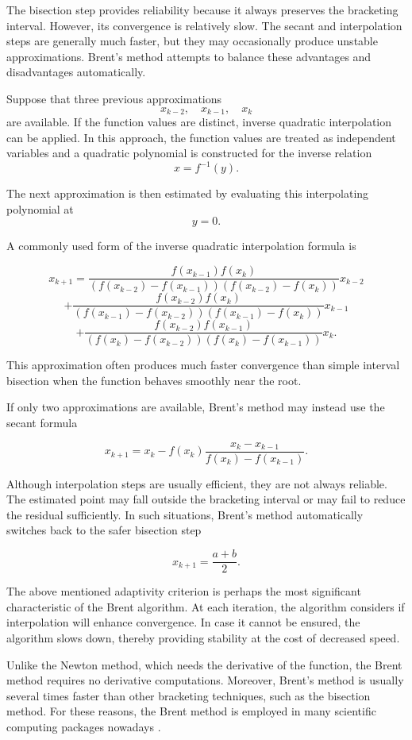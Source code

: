 The bisection step provides reliability because it always preserves the bracketing interval. However, its convergence is relatively slow. The secant and interpolation steps are generally much faster, but they may occasionally produce unstable approximations. Brent's method attempts to balance these advantages and disadvantages automatically.

Suppose that three previous approximations
\[
x_{k-2}, \quad x_{k-1}, \quad x_k
\]
are available. If the function values are distinct, inverse quadratic interpolation can be applied. In this approach, the function values are treated as independent variables and a quadratic polynomial is constructed for the inverse relation
\[
x=f^{-1}(y).
\]

The next approximation is then estimated by evaluating this interpolating polynomial at
\[
y=0.
\]

A commonly used form of the inverse quadratic interpolation formula is

\[
x_{k+1}
=
\frac{
f(x_{k-1})f(x_k)
}{
(f(x_{k-2})-f(x_{k-1}))(f(x_{k-2})-f(x_k))
}x_{k-2}
\]
\[
+
\frac{
f(x_{k-2})f(x_k)
}{
(f(x_{k-1})-f(x_{k-2}))(f(x_{k-1})-f(x_k))
}x_{k-1}
\]
\[
+
\frac{
f(x_{k-2})f(x_{k-1})
}{
(f(x_k)-f(x_{k-2}))(f(x_k)-f(x_{k-1}))
}x_k.
\]

This approximation often produces much faster convergence than simple interval bisection when the function behaves smoothly near the root.

If only two approximations are available, Brent's method may instead use the secant formula

\[
x_{k+1}
=
x_k
-
f(x_k)
\frac{x_k-x_{k-1}}{f(x_k)-f(x_{k-1})}.
\]

Although interpolation steps are usually efficient, they are not always reliable. The estimated point may fall outside the bracketing interval or may fail to reduce the residual sufficiently. In such situations, Brent's method automatically switches back to the safer bisection step

\[
x_{k+1}=\frac{a+b}{2}.
\]

The above mentioned adaptivity criterion is perhaps the most significant characteristic of the Brent algorithm. At each iteration, the algorithm considers if interpolation will enhance convergence. In case it cannot be ensured, the algorithm slows down, thereby providing stability at the cost of decreased speed.

Unlike the Newton method, which needs the derivative of the function, the Brent method requires no derivative computations. Moreover, Brent's method is usually several times faster than other bracketing techniques, such as the bisection method. For these reasons, the Brent method is employed in many scientific computing packages nowadays \cite{cs357, chapra}.

